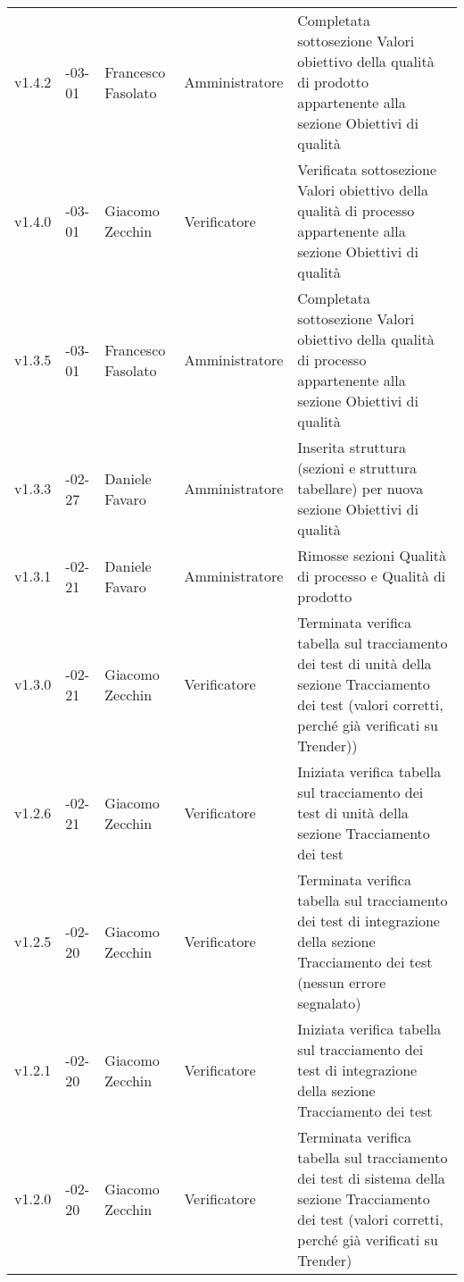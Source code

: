 \begin{longtable} { >{\centering}p{1.4cm} >{\centering}p{2cm} >{\centering}p{2.3cm} >{\centering}p{2.7cm} p{5.5cm} }
	\addlinespace[0.4em]
	\midrule
	\addlinespace[0.4em]
	v1.4.2 & 2017-03-01 & Francesco Fasolato & Amministratore & Completata sottosezione Valori obiettivo della qualità di prodotto appartenente alla sezione Obiettivi di qualità \\
	\addlinespace[0.4em]
	\midrule
	\addlinespace[0.4em]
	v1.4.0 & 2017-03-01 & Giacomo Zecchin & Verificatore & Verificata sottosezione Valori obiettivo della qualità di processo appartenente alla sezione Obiettivi di qualità \\
	\addlinespace[0.4em]
	\midrule
	\addlinespace[0.4em]	
	v1.3.5 & 2017-03-01 & Francesco Fasolato & Amministratore & Completata sottosezione Valori obiettivo della qualità di processo appartenente alla sezione Obiettivi di qualità \\ 
	\addlinespace[0.4em]
	\midrule
	\addlinespace[0.4em]
	v1.3.3 & 2017-02-27 & Daniele Favaro & Amministratore & Inserita struttura (sezioni e struttura tabellare) per nuova sezione Obiettivi di qualità \\ 
	\addlinespace[0.4em]
	\midrule
	\addlinespace[0.4em]
	v1.3.1 & 2017-02-21 & Daniele Favaro & Amministratore & Rimosse sezioni Qualità di processo e Qualità di prodotto \\
	\addlinespace[0.4em]
	\midrule
	\addlinespace[0.4em]	
	v1.3.0 & 2017-02-21 & Giacomo Zecchin & Verificatore & Terminata verifica tabella sul tracciamento dei test di unità della sezione Tracciamento dei test (valori corretti, perché già verificati su Trender)) \\ 
	\addlinespace[0.4em]
	\midrule
	\addlinespace[0.4em]
	v1.2.6 & 2017-02-21 & Giacomo Zecchin & Verificatore & Iniziata verifica tabella sul tracciamento dei test di unità della sezione Tracciamento dei test \\ 
	\addlinespace[0.4em]
	\midrule
	\addlinespace[0.4em]
	v1.2.5 & 2017-02-20 & Giacomo Zecchin & Verificatore & Terminata verifica tabella sul tracciamento dei test di integrazione della sezione Tracciamento dei test (nessun errore segnalato) \\ 
	\addlinespace[0.4em]
	\midrule
	\addlinespace[0.4em]
	v1.2.1 & 2017-02-20 & Giacomo Zecchin & Verificatore & Iniziata verifica tabella sul tracciamento dei test di integrazione della sezione Tracciamento dei test \\ 
	\addlinespace[0.4em]
	\midrule
	\addlinespace[0.4em]
	v1.2.0 & 2017-02-20 & Giacomo Zecchin & Verificatore & Terminata verifica tabella sul tracciamento dei test di sistema della sezione Tracciamento dei test (valori corretti, perché già verificati su Trender) \\ 

\end{longtable}
